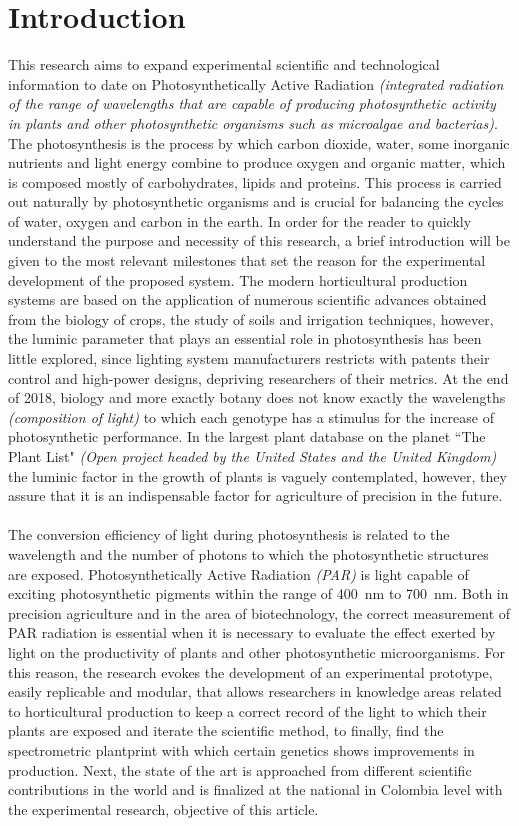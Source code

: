 \documentclass[letterpaper,12pt,twoside]{articleingud}
\begin{document}
\section{Introduction}
This research aims to expand experimental scientific and technological information to date on Photosynthetically Active Radiation \textit{(integrated radiation of the range of wavelengths that are capable of producing photosynthetic activity in plants and other photosynthetic organisms such as microalgae and bacterias)}. The photosynthesis is the process by which carbon dioxide, water, some inorganic nutrients and light energy combine to produce oxygen and organic matter, which is composed mostly of carbohydrates, lipids and proteins. This process is carried out naturally by photosynthetic organisms and is crucial for balancing the cycles of water, oxygen and carbon in the earth. In order for the reader to quickly understand the purpose and necessity of this research, a brief introduction will be given to the most relevant milestones that set the reason for the experimental development of the proposed system.
The modern horticultural production systems are based on the application of numerous scientific advances obtained from the biology of crops, the study of soils and irrigation techniques, however, the luminic parameter that plays an essential role in photosynthesis has been little explored, since lighting system manufacturers restricts with patents their control and high-power designs, depriving researchers of their metrics. At the end of 2018, biology and more exactly botany does not know exactly the wavelengths \textit{(composition of light)} to which each genotype has a stimulus for the increase of photosynthetic performance. In the largest plant database on the planet ``The Plant List" \textit{(Open project headed by the United States and the United Kingdom)} the luminic factor in the growth of plants is vaguely contemplated, however, they assure that it is an indispensable factor for agriculture of precision in the future.\cite{planetList}\\\\
The conversion efficiency of light during photosynthesis is related to the wavelength and the number of photons to which the photosynthetic structures are exposed. Photosynthetically Active Radiation \textit{(PAR)} is light capable of exciting photosynthetic pigments within the range of \SI{400}{\nano\metre} to \SI{700}{\nano\metre}. Both in precision agriculture and in the area of biotechnology, the correct measurement of PAR radiation is essential when it is necessary to evaluate the effect exerted by light on the productivity of plants and other photosynthetic microorganisms. For this reason, the research evokes the development of an experimental prototype, easily replicable and modular, that allows researchers in knowledge areas related to horticultural production to keep a correct record of the light to which their plants are exposed and iterate the scientific method, to finally, find the spectrometric plantprint with which certain genetics shows improvements in production. Next, the state of the art is approached from different scientific contributions in the world and is finalized at the national in Colombia level with the experimental research, objective of this article.
\end{document}

